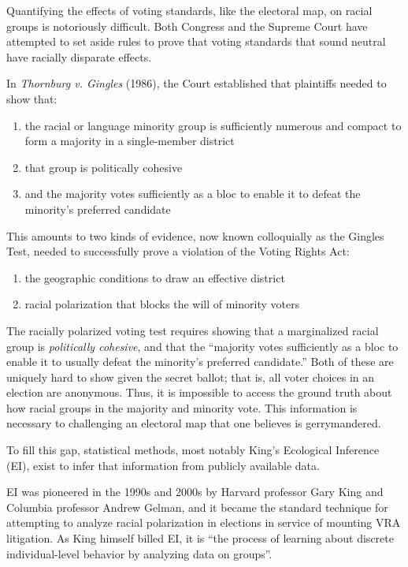 Quantifying the effects of voting standards, like the electoral map, on racial groups is notoriously difficult. Both Congress and the Supreme Court have attempted to set aside rules to prove that voting standards that sound neutral have racially disparate effects.

In \textit{Thornburg v. Gingles} (1986)\cite{thornburg}, the Court established that plaintiffs needed to show that:

\begin{enumerate}
 \item the racial or language minority group is sufficiently numerous and compact to form a majority in a single-member district
 \item that group is politically cohesive
 \item and the majority votes sufficiently as a bloc to enable it to defeat the minority’s preferred candidate
\end{enumerate}

This amounts to two kinds of evidence, now known colloquially as the Gingles Test, needed to successfully prove a violation of the Voting Rights Act:

\begin{enumerate}
 \item the geographic conditions to draw an effective district
 \item racial polarization that blocks the will of minority voters
\end{enumerate}

The racially polarized voting test requires showing that a marginalized racial group is \textit{politically cohesive}, and that the “majority votes sufficiently as a bloc to enable it to usually defeat the minority’s preferred candidate.” Both of these are uniquely hard to show given the secret ballot; that is, all voter choices in an election are anonymous. Thus, it is impossible to access the ground truth about how racial groups in the majority and minority vote. This information is necessary to challenging an electoral map that one believes is gerrymandered.

To fill this gap, statistical methods, most notably King’s Ecological Inference (EI)\cite{king1999}, exist to infer that information from publicly available data.

EI was pioneered in the 1990s and 2000s by Harvard professor Gary King and Columbia professor Andrew Gelman, and it became the standard technique for attempting to analyze racial polarization in elections in service of mounting VRA litigation. As King himself billed EI, it is “the process of learning about discrete individual-level behavior by analyzing data on groups”\cite{king1999}.

